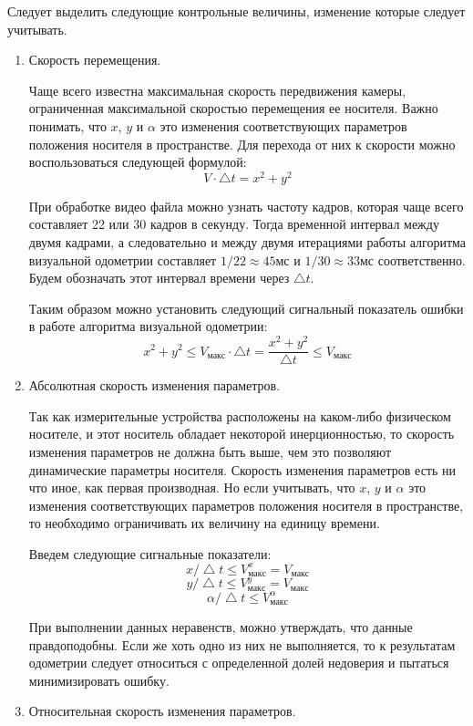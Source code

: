 Следует выделить следующие контрольные величины, изменение которые следует учитывать.
\begin{enumerate}
\item Скорость перемещения. 

Чаще всего известна максимальная скорость передвижения камеры, ограниченная максимальной скоростью перемещения ее носителя. Важно понимать, что $x$, $y$ и $\alpha$ это изменения соответствующих параметров положения носителя в пространстве. Для перехода от них к скорости можно воспользоваться следующей формулой:
 $$ V \cdot \bigtriangleup t = x^2 + y^2 $$

При обработке видео файла можно узнать частоту кадров, которая чаще всего составляет 22 или 30 кадров в секунду. Тогда временной интервал между двумя кадрами, а следовательно и между двумя итерациями работы алгоритма визуальной одометрии составляет $1/22 \approx 45 мс$ и $ 1/30 \approx 33 мс$ соответственно. Будем обозначать этот интервал времени через $\bigtriangleup t$.

Таким образом можно установить следующий сигнальный показатель ошибки в работе алгоритма визуальной одометрии:
$$  x^2 + y^2  \leqslant V_{макс} \cdot \bigtriangleup t = 
\frac{x^2 + y^2}{\bigtriangleup t} \leqslant V_{макс}
$$

\item Абсолютная скорость изменения параметров.

Так как измерительные устройства расположены на каком-либо физическом носителе, и этот носитель обладает некоторой инерционностью, то скорость изменения параметров не должна быть выше, чем это позволяют динамические параметры носителя. Скорость изменения параметров есть ни что иное, как первая производная. Но если учитывать, что  $x$, $y$ и $\alpha$ это изменения соответствующих параметров положения носителя в пространстве, то необходимо ограничивать их величину на единицу времени. 

Введем следующие сигнальные показатели:
$$x/ \bigtriangleup t \leqslant V_{макс}^x = V_{макс}$$
$$y / \bigtriangleup t \leqslant V_{макс}^y = V_{макс}$$
$$\alpha / \bigtriangleup t \leqslant V_{макс}^{\alpha}$$

При выполнении данных неравенств, можно утверждать, что данные правдоподобны. Если же хоть одно из них не выполняется, то к результатам одометрии следует относиться с определенной долей недоверия и пытаться минимизировать ошибку.

\item Относительная скорость изменения параметров.


\end{enumerate}
